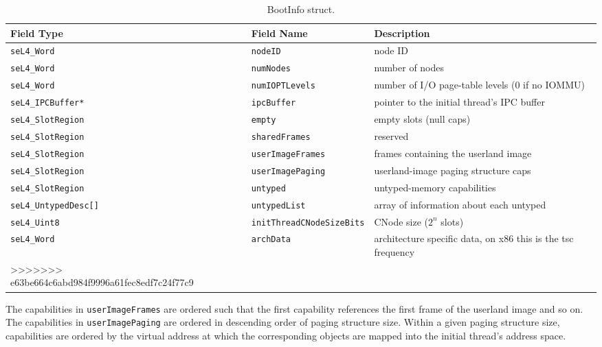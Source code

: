 \begin{table}[htb]
  \begin{center}
    \caption{BootInfo struct.}
    \label{tab:bootinfo_struct}
    \begin{tabularx}{\textwidth}{llX}
      \toprule
      Field Type & Field Name & Description \\
      \midrule
      \texttt{seL4\_Word}           & \texttt{nodeID}                  & node ID \\
      \texttt{seL4\_Word}           & \texttt{numNodes}                & number of nodes \\
      \texttt{seL4\_Word}           & \texttt{numIOPTLevels}           & number of I/O page-table levels (0 if no IOMMU) \\
      \texttt{seL4\_IPCBuffer*}     & \texttt{ipcBuffer}               & pointer to the initial thread's IPC buffer \\
      \texttt{seL4\_SlotRegion}     & \texttt{empty}                   & empty slots (null caps) \\
      \texttt{seL4\_SlotRegion}     & \texttt{sharedFrames}            & reserved \\
      \texttt{seL4\_SlotRegion}     & \texttt{userImageFrames}         & frames containing the userland image \\
      \texttt{seL4\_SlotRegion}     & \texttt{userImagePaging}         & userland-image paging structure caps \\
      \texttt{seL4\_SlotRegion}     & \texttt{untyped}                 & untyped-memory capabilities \\
      \texttt{seL4\_UntypedDesc[]}  & \texttt{untypedList}             & array of information about each untyped \\
      \texttt{seL4\_Uint8}          & \texttt{initThreadCNodeSizeBits} & CNode size ($2^n$ slots) \\
      \texttt{seL4\_Word}           & \texttt{archData}        & architecture specific data, on x86 this is the tsc frequency\\
>>>>>>> e63be664c6abd984f9996a61fec8edf7c24f77c9
      \bottomrule
    \end{tabularx}
  \end{center}
\end{table}

The capabilities in \texttt{userImageFrames} are
ordered such that the first capability references the first frame of the
userland image and so on.
The capabilities in \texttt{userImagePaging} are ordered in descending order
of paging structure size. Within a given paging structure size, capabilities are
ordered by the virtual address at which the corresponding objects are mapped
into the initial thread's address space.

